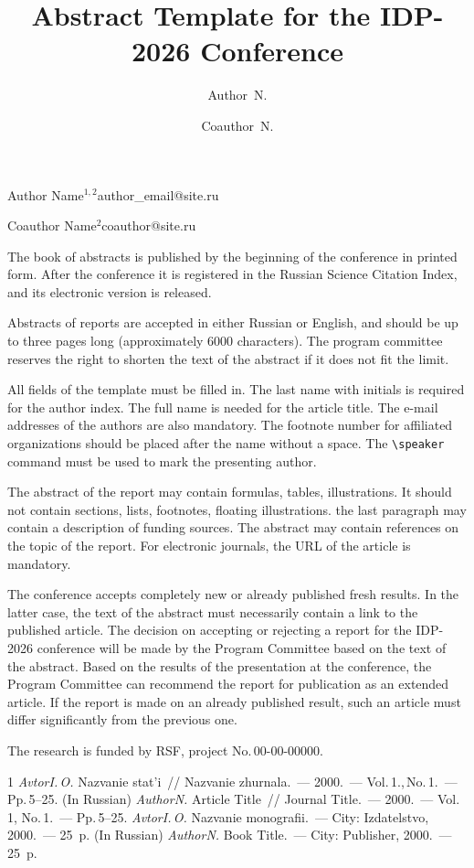 \documentclass[twoside]{article}
\begin{document}
\English
\title{Abstract Template for the  IDP-2026 Conference}
\author{Author~N.}{Author Name$^{1, 2}$}{author\_email@site.ru}
\author{Coauthor~N.}{Coauthor Name$^2$\speaker}{coauthor@site.ru}
\maketitle

The book of abstracts is published by the beginning of the conference in printed form.
After the conference it is registered in the Russian Science Citation Index, and its electronic version is released.

Abstracts of reports are accepted in either Russian or English, and should be up to three pages long (approximately 6000 characters).
The program committee reserves the right to shorten the text of the abstract if it does not fit the limit.

All fields of the template must be filled in.
The last name with initials is required for the author index.
The full name is needed for the article title.
The e-mail addresses of the authors are also mandatory.
The footnote number for affiliated organizations should be placed after the name without a space.
The \verb|\speaker| command must be used to mark the presenting author.

The abstract of the report may contain formulas, tables, illustrations.
It should not contain sections, lists, footnotes, floating illustrations.
the last paragraph may contain a description of funding sources.
The abstract may contain references on the topic of the report.
For electronic journals, the URL of the article is mandatory.

The conference accepts completely new or already published fresh results.
In the latter case, the text of the abstract must necessarily contain a link to the published article.
The decision on accepting or rejecting a report for the IDP-2026 conference
will be made by the Program Committee based on the text of the abstract.
Based on the results of the presentation at the conference, the Program Committee can recommend the report for publication as an extended article.
If the report is made on an already published result, such an article must differ significantly from the previous one.

The research is funded by RSF, project No.\,00-00-00000.

\begin{thebibliography}{1}
    \emph{Avtor\;I.\,O.}
    Nazvanie stat'i~//
    Nazvanie zhurnala.~--- 2000.~--- Vol.\,1.,\,No.\,1.~--- Pp.\,5--25. (In Russian)
    \emph{Author\;N.}
    Article Title~//
    Journal Title.~--- 2000.~--- Vol.\,1, No.\,1.~--- Pp.\,5--25.
    \emph{Avtor\;I.\,O.}
    Nazvanie monografii.~--- City: Izdatelstvo, 2000.~--- 25~p. (In Russian)
    \emph{Author\;N.}
    Book Title.~--- City: Publisher, 2000.~--- 25~p.
\end{thebibliography}
\end{document}
